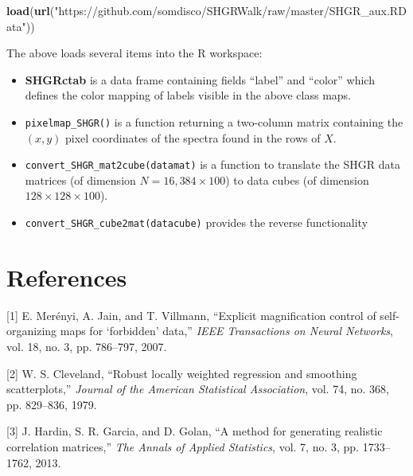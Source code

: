\documentclass[]{article}
\newenvironment{Shaded}{\begin{snugshade}}{\end{snugshade}}
\newcommand{\KeywordTok}[1]{\textcolor[rgb]{0.13,0.29,0.53}{\textbf{#1}}}
\newcommand{\NormalTok}[1]{#1}
\newcommand{\StringTok}[1]{\textcolor[rgb]{0.31,0.60,0.02}{#1}}
\providecommand{\tightlist}{%
  \setlength{\itemsep}{0pt}\setlength{\parskip}{0pt}}
\begin{document}
\begin{Shaded}
\begin{Highlighting}[]
\KeywordTok{load}\NormalTok{(}\KeywordTok{url}\NormalTok{(}\StringTok{"https://github.com/somdisco/SHGRWalk/raw/master/SHGR_aux.RData"}\NormalTok{))}
\end{Highlighting}
\end{Shaded}

The above loads several items into the R workspace:

\begin{itemize}
\tightlist
\item
  \textbf{SHGRctab} is a data frame containing fields ``label'' and ``color'' which defines the color mapping of labels visible in the above class maps.\\
\item
  \texttt{pixelmap\_SHGR()} is a function returning a two-column matrix containing the \((x,y)\) pixel coordinates of the spectra found in the rows of \(X\).
\item
  \texttt{convert\_SHGR\_mat2cube(datamat)} is a function to translate the SHGR data matrices (of dimension \(N = 16,384 \times 100\)) to data cubes (of dimension \(128 \times 128 \times 100\)).
\item
  \texttt{convert\_SHGR\_cube2mat(datacube)} provides the reverse functionality
\end{itemize}

\hypertarget{references}{%
\section{References}\label{references}}

\hypertarget{refs}{}
\leavevmode\hypertarget{ref-MerenyiJainVillmann}{}%
{[}1{]} E. Merényi, A. Jain, and T. Villmann, ``Explicit magnification control of self-organizing maps for `forbidden' data,'' \emph{IEEE Transactions on Neural Networks}, vol. 18, no. 3, pp. 786--797, 2007.

\leavevmode\hypertarget{ref-Lowess}{}%
{[}2{]} W. S. Cleveland, ``Robust locally weighted regression and smoothing scatterplots,'' \emph{Journal of the American Statistical Association}, vol. 74, no. 368, pp. 829--836, 1979.

\leavevmode\hypertarget{ref-Toeplitz}{}%
{[}3{]} J. Hardin, S. R. Garcia, and D. Golan, ``A method for generating realistic correlation matrices,'' \emph{The Annals of Applied Statistics}, vol. 7, no. 3, pp. 1733--1762, 2013.
\end{document}
